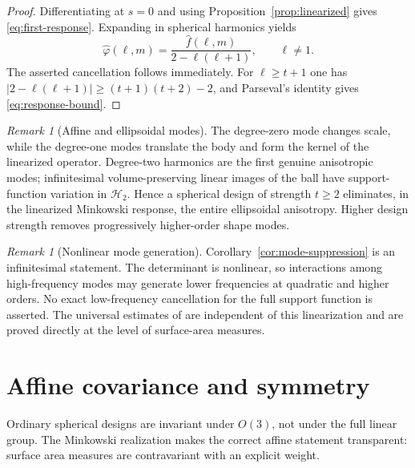 \documentclass[11pt]{article}
\theoremstyle{definition}
\theoremstyle{remark}
\newtheorem{remark}[theorem]{Remark}
\newcommand{\Harm}{\mathcal H}
\begin{document}
\begin{proof}
Differentiating at $s=0$ and using Proposition~\ref{prop:linearized} gives \eqref{eq:first-response}. Expanding in spherical harmonics yields
\[
\widehat\varphi(\ell,m)
=\frac{\widehat f(\ell,m)}{2-\ell(\ell+1)},\qquad \ell\ne1.
\]
The asserted cancellation follows immediately. For $\ell\ge t+1$ one has
$|2-\ell(\ell+1)|\ge (t+1)(t+2)-2$, and Parseval's identity gives \eqref{eq:response-bound}.
\end{proof}

\begin{remark}[Affine and ellipsoidal modes]\label{rem:ellipsoidal}
The degree-zero mode changes scale, while the degree-one modes translate the body and form the kernel of the linearized operator. Degree-two harmonics are the first genuine anisotropic modes; infinitesimal volume-preserving linear images of the ball have support-function variation in $\Harm_2$. Hence a spherical design of strength $t\ge2$ eliminates, in the linearized Minkowski response, the entire ellipsoidal anisotropy. Higher design strength removes progressively higher-order shape modes.
\end{remark}

\begin{remark}[Nonlinear mode generation]\label{rem:nonlinear-generation}
Corollary~\ref{cor:mode-suppression} is an infinitesimal statement. The determinant is nonlinear, so interactions among high-frequency modes may generate lower frequencies at quadratic and higher orders. No exact low-frequency cancellation for the full support function is asserted. The universal estimates of  are independent of this linearization and are proved directly at the level of surface-area measures.
\end{remark}

\section{Affine covariance and symmetry}\label{sec:affine}

Ordinary spherical designs are invariant under $O(3)$, not under the full linear group. The Minkowski realization makes the correct affine statement transparent: surface area measures are contravariant with an explicit weight.
\end{document}
